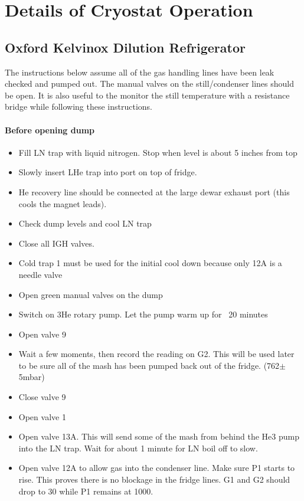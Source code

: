 \chapter{Details of Cryostat Operation}
\label{sec:cryostat}

\section{Oxford Kelvinox Dilution Refrigerator}
\label{sec:kelvinox}

The instructions below assume all of the gas handling lines have been leak checked and pumped out. The manual valves on the still/condenser lines should be open. It is also useful to the monitor the still temperature with a resistance bridge while following these instructions.

\subsubsection*{Before opening dump}

\begin{itemize}
\item Fill LN trap with liquid nitrogen. Stop when level is about 5 inches from top
\item Slowly insert LHe trap into port on top of fridge. 
\item He recovery line should be connected at the large dewar exhaust port (this cools the magnet leads).
\item Check dump levels and cool LN trap
\item Close all IGH valves. 
\item Cold trap 1 must be used for the initial cool down because only 12A is a needle valve
\item Open green manual valves on the dump
\item Switch on 3He rotary pump. Let the pump warm up for ~20 minutes
\item Open valve 9
\item Wait a few moments, then record the reading on G2. This will be used later to be sure all of the mash has been pumped back out of the fridge. (762$\pm$5mbar)
\item Close valve 9
\item Open valve 1
\item Open valve 13A. This will send some of the mash from behind the He3 pump into the LN trap. Wait for about 1 minute for LN boil off to slow. 
\item Open valve 12A to allow gas into the condenser line. Make sure P1 starts to rise. This proves there is no blockage in the fridge lines. G1 and G2 should drop to 30 while P1 remains at 1000.
\end{itemize}

